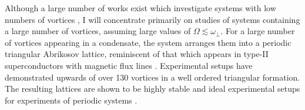Although a large number of works exist which investigate systems with low numbers of vortices \cite{THS:Davies_2000,Vtx:Chevy_prl_2000,Vtx:Cooper_prl_2001,Vtx:Rosenbusch_prl_2002,Vtx:Ogawa_pra_2002,Vtx:Bretin_joptb_2003}, I will concentrate primarily on studies of systems containing a large number of vortices, assuming large values of $\Omega \lesssim \omega_\perp$. For a large number of vortices appearing in a condensate, the system arranges them into a periodic triangular Abrikosov lattice, reminiscent of that which appears in type-II superconductors with magnetic flux lines \cite{Vtx:AboShaeer_sci_2001}. Experimental setups have demonstrated upwards of over 130 vortices in a well ordered triangular formation. The resulting lattices are shown to be highly stable and ideal experimental setups for experiments of periodic systems \cite{Vtx:AboShaeer_sci_2001,Vtx:Engels_prl_2002}.


